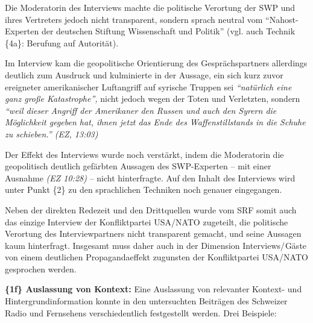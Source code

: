 Die Moderatorin des Interviews machte die politische Verortung der SWP
und ihres Vertreters jedoch nicht transparent, sondern sprach neutral
vom ``Nahost-Experten der deutschen Stiftung Wissenschaft und Politik''
(vgl. auch Technik \{4a\}: Berufung auf Autorität).

Im Interview kam die geopolitische Orientierung des Gesprächspartners
allerdings deutlich zum Ausdruck und kulminierte in der Aussage, ein
sich kurz zuvor ereigneter amerikanischer Luftangriff auf syrische
Truppen sei \emph{``natürlich eine ganz große Katastrophe'',} nicht
jedoch wegen der Toten und Ver­letzten, sondern \emph{``weil dieser
Angriff der Amerikaner den Russen und auch den Syrern die Möglich­keit
gegeben hat, ihnen jetzt das Ende des Waffenstillstands in die Schuhe zu
schieben.'' (EZ, 13:03)}

Der Effekt des Interviews wurde noch verstärkt, indem die Moderatorin
die geopolitisch deutlich gefärbten Aussagen des SWP-Experten -- mit
einer Ausnahme \emph{(EZ 10:28)} -- nicht hinter­fragte. Auf den Inhalt
des Interviews wird unter Punkt \{2\} zu den sprachlichen Techniken noch
genauer eingegangen.

Neben der direkten Redezeit und den Drittquellen wurde vom SRF somit
auch das einzige Interview der Konfliktpartei USA/NATO zugeteilt, die
politische Verortung des Interviewpartners nicht transparent gemacht,
und seine Aussagen kaum hinterfragt. Insgesamt muss daher auch in der
Dimension Interviews/ Gäste von einem deutlichen Propagandaeffekt
zugunsten der Konfliktpartei USA/NATO gesprochen werden.

\textbf{\{1f\} Auslassung von Kontext:} Eine Auslassung von relevanter
Kontext- und Hintergrundinformation konnte in den untersuchten Beiträgen
des Schweizer Radio und Fernsehens verschiedentlich festgestellt werden.
Drei Beispiele:

